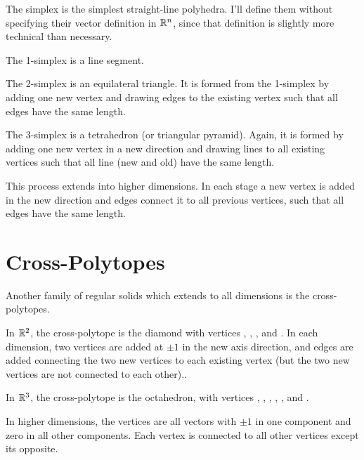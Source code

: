 \documentclass[fleqn]{report}
\begin{document}
The simplex is the simplest straight-line polyhedra.
I'll define them without specifying their vector definition in
$\mathbb{R}^n$, since that definition is slightly more technical than
necessary.
\begin{smallitemize}
\item The 1-simplex is a line segment. 
\item The 2-simplex is an equilateral triangle. It is formed
from the 1-simplex by adding one new vertex and drawing edges
to the existing vertex such that all edges have the same
length.
\item The 3-simplex is a tetrahedron (or triangular pyramid).
Again, it is formed by adding one new vertex in a new
direction and drawing lines to all existing vertices such that
all line (new and old) have the same length.
\item This process extends into higher dimensions. In each stage a new
vertex is added in the new direction and edges connect it to
all previous vertices, such that all edges have the same
length. 
\end{smallitemize}

\section{Cross-Polytopes}

Another family of regular solids which extends to all
dimensions is the cross-polytopes. 
\begin{smallitemize}
\item In $\mathbb{R}^2$, the cross-polytope is the diamond with
vertices ,
,
, and
. In each dimension, two
vertices are added at $\pm 1$ in the new axis direction, and
edges are added connecting the two new vertices to each
existing vertex (but the two new vertices are not connected to
each other).. 
\item In $\mathbb{R}^3$, the cross-polytope is the octahedron, with
vertices
, 
, 
, 
, 
, and
. 
\item In higher dimensions, the vertices are all vectors with
$\pm 1$ in one component and zero in all other components.
Each vertex is connected to all other vertices except its
opposite.
\end{smallitemize}
\end{document}
